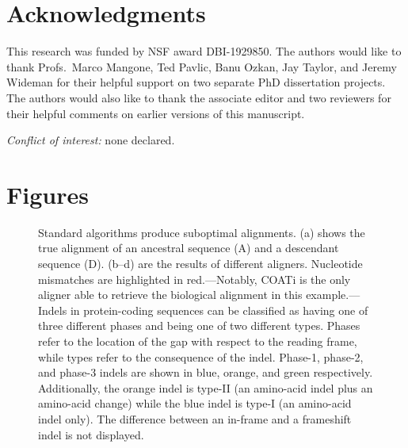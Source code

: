 \documentclass[12pt,letterpaper]{article}
\begin{document}

\section*{Acknowledgments}

This research was funded by NSF award DBI-1929850.
%
The authors would like to thank Profs.\ Marco Mangone, Ted Pavlic, Banu Ozkan, Jay Taylor, and Jeremy Wideman for their helpful support on two separate PhD dissertation projects. The authors would also like to thank the associate editor and two reviewers for their helpful comments on earlier versions of this manuscript.

\noindent \textit{Conflict of interest:} none declared.

\newpage
\section*{Figures}

\begin{figure}[ht]
    \centering%
    \par
    \caption{
        Standard algorithms produce suboptimal alignments.
        (a) shows the true alignment of an ancestral sequence (A) and a descendant sequence (D).
        (b--d) are the results of different aligners. Nucleotide mismatches are highlighted in red.---Notably, COATi is the only aligner able to retrieve the biological alignment in this example.---%
        Indels in protein-coding sequences can be classified as having one of three different phases and being one of two different types.
        Phases refer to the location of the gap with respect to the reading frame, while types refer to the consequence of the indel.
        Phase-1, phase-2, and phase-3 indels are shown in blue, orange, and green respectively.
        Additionally, the orange indel is type-II (an amino-acid indel plus an amino-acid change) while the blue indel is type-I (an amino-acid indel only). The difference between an in-frame and a frameshift indel is not displayed.
        \label{fig:aln}}
\end{figure}
\end{document}
